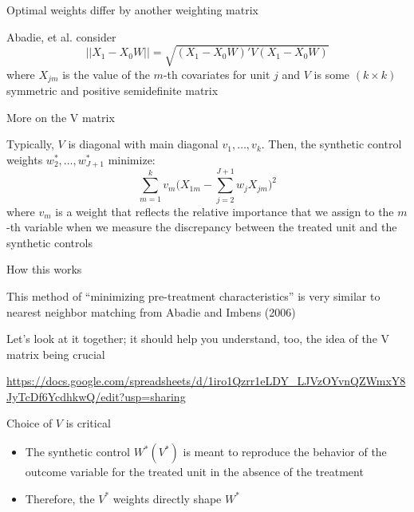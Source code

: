 \documentclass{beamer}
\begin{document}
\begin{frame}{Optimal weights differ by another weighting matrix}
	
Abadie, et al. consider $$||X_1 - X_0W||=\sqrt{(X_1-X_0W)'V(X_1-X_0W)}$$where $X_{jm}$ is the value of the $m$-th covariates for unit $j$ and $V$ is some $(k\times k)$ symmetric and positive semidefinite matrix

\end{frame}

\begin{frame}{More on the V matrix}

Typically, $V$ is diagonal with main diagonal $v_1, \dots, v_k$.  Then, the synthetic control weights $w_2^*, \dots, w_{J+1}^*$ minimize: $$\sum_{m=1}^k v_m \bigg(X_{1m} - \sum_{j=2}^{J+1}w_jX_{jm}\bigg)^2$$ where $v_m$ is a weight that reflects the relative importance that we assign to the $m$-th variable when we measure the discrepancy between the treated unit and the synthetic controls

\end{frame}

\begin{frame}{How this works}

This method of ``minimizing pre-treatment characteristics'' is very similar to nearest neighbor matching from Abadie and Imbens (2006)

\bigskip

Let's look at it together; it should help you understand, too, the idea of the V matrix being crucial

\bigskip

\url{https://docs.google.com/spreadsheets/d/1iro1Qzrr1eLDY_LJVzOYvnQZWmxY8JyTcDf6YcdhkwQ/edit?usp=sharing}

\end{frame}

\begin{frame}{Choice of $V$ is critical}
	
		\begin{itemize}
		\item The synthetic control $W^*(V^*)$ is meant to reproduce the behavior of the outcome variable for the treated unit in the absence of the treatment
		\item Therefore, the $V^*$ weights directly shape $W^*$
		\end{itemize}
\end{frame}
\end{document}
